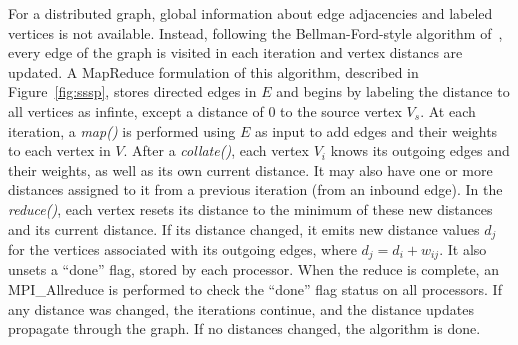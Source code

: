 For a distributed graph, global information about edge adjacencies and
labeled vertices is not available.  Instead, following the
Bellman-Ford-style algorithm of~\cite{SSSPMapReduce, Bellman58,
Ford62}, every edge of the graph is visited in each iteration and
vertex distancs are updated.  A MapReduce formulation of this
algorithm, described in Figure~\ref{fig:sssp}, stores directed edges
in $E$ and begins by labeling the distance to all vertices as infinte,
except a distance of 0 to the source vertex $V_s$.  At each iteration,
a {\it map()} is performed using $E$ as input to add edges and their
weights to each vertex in $V$.  After a {\it collate()}, each vertex
$V_i$ knows its outgoing edges and their weights, as well as its own
current distance.  It may also have one or more distances assigned to
it from a previous iteration (from an inbound edge).  In the {\it
reduce()}, each vertex resets its distance to the minimum of these new
distances and its current distance.  If its distance changed, it emits
new distance values $d_j$ for the vertices associated with its
outgoing edges, where $d_j = d_i + w_{ij}$.  It also unsets a ``done''
flag, stored by each processor.  When the reduce is complete, an
MPI\_Allreduce is performed to check the ``done'' flag status on all
processors.  If any distance was changed, the iterations continue, and
the distance updates propagate through the graph.  If no distances
changed, the algorithm is done.

